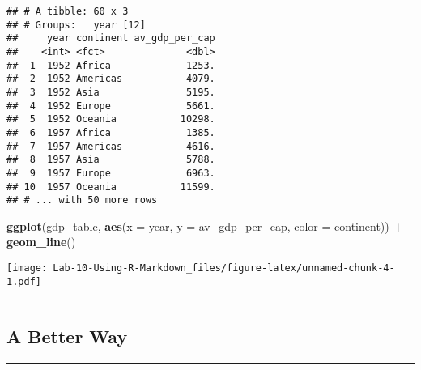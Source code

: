 \documentclass[]{article}
\newenvironment{Shaded}{\begin{snugshade}}{\end{snugshade}}
\newcommand{\DataTypeTok}[1]{\textcolor[rgb]{0.13,0.29,0.53}{#1}}
\newcommand{\KeywordTok}[1]{\textcolor[rgb]{0.13,0.29,0.53}{\textbf{#1}}}
\newcommand{\NormalTok}[1]{#1}
\newcommand{\OperatorTok}[1]{\textcolor[rgb]{0.81,0.36,0.00}{\textbf{#1}}}
\newcommand{\StringTok}[1]{\textcolor[rgb]{0.31,0.60,0.02}{#1}}
\begin{document}
\begin{Shaded}
\end{Shaded}

\begin{verbatim}
## # A tibble: 60 x 3
## # Groups:   year [12]
##     year continent av_gdp_per_cap
##    <int> <fct>              <dbl>
##  1  1952 Africa             1253.
##  2  1952 Americas           4079.
##  3  1952 Asia               5195.
##  4  1952 Europe             5661.
##  5  1952 Oceania           10298.
##  6  1957 Africa             1385.
##  7  1957 Americas           4616.
##  8  1957 Asia               5788.
##  9  1957 Europe             6963.
## 10  1957 Oceania           11599.
## # ... with 50 more rows
\end{verbatim}

\begin{Shaded}
\begin{Highlighting}[]
\KeywordTok{ggplot}\NormalTok{(gdp_table, }\KeywordTok{aes}\NormalTok{(}\DataTypeTok{x =}\NormalTok{ year, }\DataTypeTok{y =}\NormalTok{ av_gdp_per_cap, }\DataTypeTok{color =}\NormalTok{ continent)) }\OperatorTok{+}\StringTok{ }\KeywordTok{geom_line}\NormalTok{()}
\end{Highlighting}
\end{Shaded}

\texttt{[image: Lab-10-Using-R-Markdown\_files/figure-latex/unnamed-chunk-4-1.pdf]}

\begin{center}\rule{0.5\linewidth}{\linethickness}\end{center}

\hypertarget{a-better-way}{%
\subsection{A Better Way}\label{a-better-way}}

\begin{center}\rule{0.5\linewidth}{\linethickness}\end{center}
\end{document}
